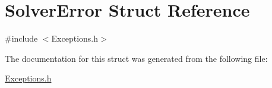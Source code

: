 \hypertarget{structSolverError}{}\section{Solver\+Error Struct Reference}
\label{structSolverError}


{\ttfamily \#include $<$Exceptions.\+h$>$}



The documentation for this struct was generated from the following file\+:\begin{DoxyCompactItemize}
\item 
\hyperlink{Exceptions_8h}{Exceptions.\+h}\end{DoxyCompactItemize}

